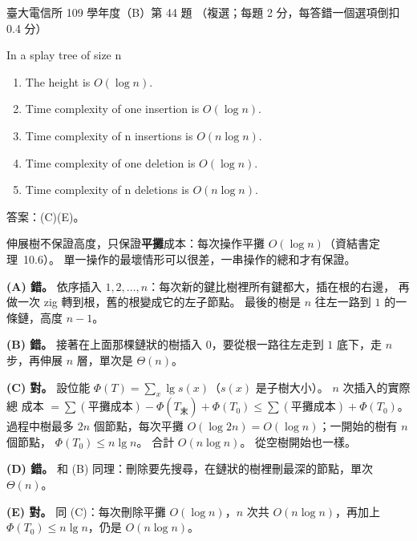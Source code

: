 \begin{pastexam}[label={px:ntu-109-comm-dsa-44}]{臺大電信所 109 學年度（B）第 44 題}
（複選；每題 2 分，每答錯一個選項倒扣 0.4 分）

In a splay tree of size n
\begin{enumerate}[label=(\Alph*),nosep]
\item The height is $O(\log n)$.
\item Time complexity of one insertion is $O(\log n)$.
\item Time complexity of n insertions is $O(n\log n)$.
\item Time complexity of one deletion is $O(\log n)$.
\item Time complexity of n deletions is $O(n\log n)$.
\end{enumerate}
\end{pastexam}

\begin{pastsoln}
答案：(C)(E)。

伸展樹不保證高度，只保證\textbf{平攤}成本：每次操作平攤 $O(\log n)$（資結書定理~10.6）。
單一操作的最壞情形可以很差，一串操作的總和才有保證。

\textbf{(A) 錯。} 依序插入 $1, 2, \ldots, n$：每次新的鍵比樹裡所有鍵都大，插在根的右邊，
再做一次 zig 轉到根，舊的根變成它的左子節點。 最後的樹是 $n$ 往左一路到 $1$ 的一條鏈，高度
$n - 1$。

\textbf{(B) 錯。} 接著在上面那棵鏈狀的樹插入 $0$，要從根一路往左走到 $1$ 底下，走 $n$ 步，再伸展
$n$ 層，單次是 $\Theta(n)$。

\textbf{(C) 對。} 設位能 $\Phi(T) = \sum_x \lg s(x)$（$s(x)$ 是子樹大小）。 $n$ 次插入的實際總
成本 $= \sum(\text{平攤成本}) - \Phi(T_{\text{末}}) + \Phi(T_0) \le \sum(\text{平攤成本}) + \Phi(T_0)$。
過程中樹最多 $2n$ 個節點，每次平攤 $O(\log 2n) = O(\log n)$；一開始的樹有 $n$ 個節點，
$\Phi(T_0) \le n \lg n$。 合計 $O(n \log n)$。 從空樹開始也一樣。

\textbf{(D) 錯。} 和 (B) 同理：刪除要先搜尋，在鏈狀的樹裡刪最深的節點，單次 $\Theta(n)$。

\textbf{(E) 對。} 同 (C)：每次刪除平攤 $O(\log n)$，$n$ 次共 $O(n\log n)$，再加上
$\Phi(T_0) \le n\lg n$，仍是 $O(n\log n)$。
\end{pastsoln}
